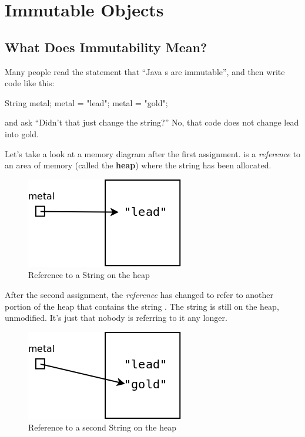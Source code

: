 \chapter{Immutable Objects}

\section{What Does Immutability Mean?}

Many people read the statement that ``Java s are immutable'', and then write code like this:

\begin{code}
String metal;
metal = "lead";
metal = "gold";
\end{code}

and ask ``Didn't that just change the string?''  No, that code does not change lead into gold.

Let's take a look at a memory diagram after the first assignment.  is a {\em reference} to an area of memory (called the {\bf heap}) where the string  has been allocated.

\begin{figure}[!h]
\begin{center}
\includegraphics[scale=0.4]{figs/ch09/heap1.png}
\caption{Reference to a String on the heap}
\label{fig.heap1}
\end{center}
\end{figure}

After the second assignment, the {\em reference} has changed to refer to another portion of the heap that contains the string . The string  is still on the heap, unmodified. It's just that nobody is referring to it any longer.

\begin{figure}[!h]
\begin{center}
\includegraphics[scale=0.4]{figs/ch09/heap2.png}
\caption{Reference to a second String on the heap}
\label{fig.heap2}
\end{center}
\end{figure}

